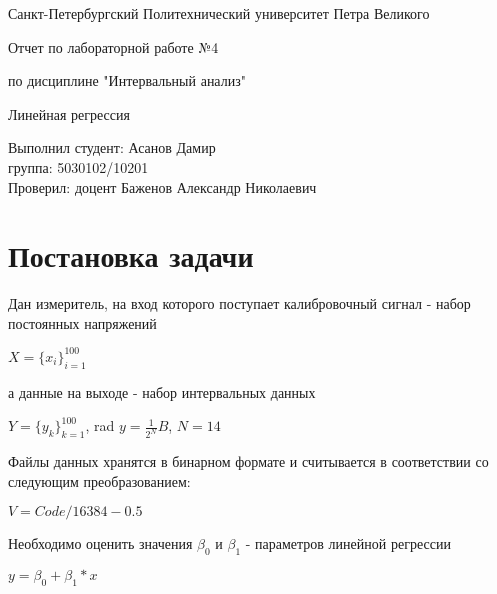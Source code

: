 \documentclass[a4paper, 12pt]{article}
\begin{document}
\begin{titlepage}
    \centering
    \vspace*{2cm}
    
    {\Large Санкт-Петербургский Политехнический университет Петра Великого \par}
    \vspace{1.5cm}
    
    {\huge Отчет по лабораторной работе №4 \par}
    {\huge по дисциплине "Интервальный анализ" \par}
    \vspace{2cm}
    
    {\Large Линейная регрессия\par}
    \vfill
    
    \begin{flushright}
Выполнил студент:
Асанов Дамир \\   
группа:
5030102/10201\\
Проверил:
доцент
Баженов Александр Николаевич
\end{flushright}
\end{titlepage}



\newpage %
\tableofcontents


\newpage
\section{Постановка задачи}

Дан измеритель, на вход которого поступает калибровочный сигнал - набор постоянных напряжений
\begin{center}
    $X = \lbrace x_i \rbrace ^{100}_{i = 1}$
\end{center}
а данные на выходе - набор интервальных данных
\begin{center}
    $Y = \lbrace y _k \rbrace ^{100}_{k = 1}$, rad $y = \frac{1}{2^N}B$, $N = 14$
\end{center} 
Файлы данных хранятся в бинарном формате и считывается в соответствии со следующим преобразованием:
\begin{center}
    $V = \textit{Code}/16384 - 0.5$
\end{center} 

Необходимо оценить значения $\beta _0$ и $\beta _1$ - параметров  линейной регрессии
\begin{center}
    $y = \beta _0 + \beta _1 * x$
\end{center}
\end{document}
